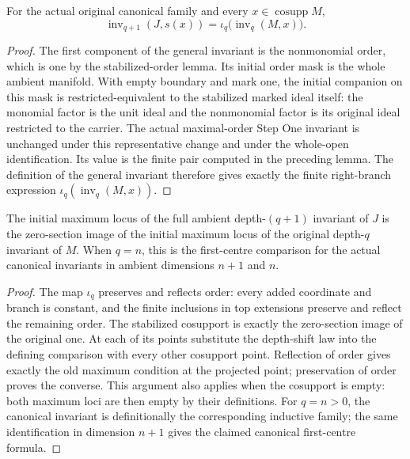 \begin{theorem}
\label{hir:disjoint-zero-coordinate-initial-value}
\leanok
For the actual original canonical family and every
$x\in\operatorname{cosupp}M$,
\[
 \operatorname{inv}_{q+1}(J,s(x))
 =\iota_q\bigl(\operatorname{inv}_q(M,x)\bigr).
\]
\end{theorem}
\begin{proof}
The first component of the general invariant is the nonmonomial order,
which is one by the stabilized-order lemma. Its initial order mask is the
whole ambient manifold. With empty boundary and mark one, the initial
companion on this mask is restricted-equivalent to the stabilized marked
ideal itself: the monomial factor is the unit ideal and the nonmonomial
factor is its original ideal restricted to the carrier. The actual
maximal-order Step One invariant is unchanged under this representative
change and under the whole-open identification. Its value is the finite
pair computed in the preceding lemma. The definition of the general
invariant therefore gives exactly the finite right-branch expression
$\iota_q(\operatorname{inv}_q(M,x))$.
\end{proof}

\begin{theorem}
\label{hir:disjoint-zero-coordinate-initial-centre}
\leanok
The initial maximum locus of the full ambient depth-$(q+1)$ invariant of
$J$ is the zero-section image of the initial maximum locus of the original
depth-$q$ invariant of $M$. When $q=n$, this is the first-centre comparison
for the actual canonical invariants in ambient dimensions $n+1$ and $n$.
\end{theorem}
\begin{proof}
The map $\iota_q$ preserves and reflects order: every added coordinate and
branch is constant, and the finite inclusions in top extensions preserve
and reflect the remaining order. The stabilized cosupport is exactly the
zero-section image of the original one. At each of its points substitute
the depth-shift law into the defining comparison with every other
cosupport point. Reflection of order gives exactly the old maximum
condition at the projected point; preservation of order proves the
converse. This argument also applies when the cosupport is empty: both
maximum loci are then empty by their definitions. For $q=n>0$, the
canonical invariant is definitionally the corresponding inductive family;
the same identification in dimension $n+1$ gives the claimed canonical
first-centre formula.
\end{proof}

